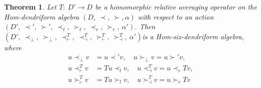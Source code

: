 \documentclass[10pt,a4paper]{amsart}
\newtheorem{thm}{Theorem}
\begin{document}
\begin{thm}
Let $T :\ D' \to D$ be a homomorphic relative averaging operator on the Hom-dendriform algebra $(D  ,\ \prec  ,\ \succ  ,\alpha)$ with respect to an action $(D',\  \prec' ,\ \succ',\  \prec_\ell ,\ \succ_\ell,\  \prec_r ,\ \succ_r ,\ \alpha')$. Then \\$(D',\  \prec_\perp,\  \succ_\perp,\  \prec^T_\vdash,\  \prec^T_\dashv ,\ \succ^T_\vdash ,\ \succ^T_\dashv,\  \alpha')$is a Hom-six-dendriform algebra, where
\begin{align*}
u \prec_\perp v &= u \prec' v ,\quad 
u \succ_\perp v = u \succ' v ,\\ 
u \prec^T_\vdash v &= T u \prec_l v ,\quad
u \prec^T_\dashv v = u \prec_r T v ,\\
u \succ^T_\vdash v &= T u \succ_l v ,\quad 
u \succ^T_\dashv v = u \succ_r T v 
\end{align*}
\end{thm} 
\end{document}
